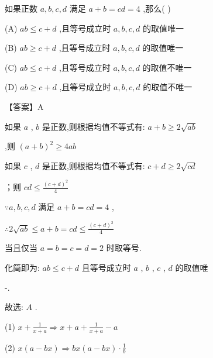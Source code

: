 \documentclass[11pt,a4paper]{article}
\begin{document}
\begin{problem} 
如果正数 \(\displaystyle a,b,c,d\) 满足 \(\displaystyle a + b = {cd} = 4\) ,那么(   )

(A) \(\displaystyle {ab} \leq  c + d\) ,且等号成立时 \(\displaystyle a,b,c,d\) 的取值唯一

(B) \(\displaystyle {ab} \geq  c + d\) ,且等号成立时 \(\displaystyle a,b,c,d\) 的取值唯一

(C) \(\displaystyle {ab} \leq  c + d\) ,且等号成立时 \(\displaystyle a,b,c,d\) 的取值不唯一

(D) \(\displaystyle {ab} \geq  c + d\) ,且等号成立时 \(\displaystyle a,b,c,d\) 的取值不唯一
\begin{jiexi}
【答案】A

如果 \(\displaystyle a\) , \(\displaystyle b\) 是正数,则根据均值不等式有: \(\displaystyle a + b \geq  2\sqrt{ab}\)

,则 \(\displaystyle {\left( a + b\right) }^{2} \geq  {4ab}\)

如果 \(\displaystyle c\) , \(\displaystyle d\) 是正数,则根据均值不等式有: \(\displaystyle c + d \geq  2\sqrt{cd}\)

；则 \(\displaystyle {cd} \leq  \frac{{\left( c + d\right) }^{2}}{4}\)

\(\displaystyle \because a,b,c,d\) 满足 \(\displaystyle a + b = {cd} = 4\) ,

\(\displaystyle \therefore 2\sqrt{ab} \leq  a + b = {cd} \leq  \frac{{\left( c + d\right) }^{2}}{4}\)

当且仅当 \(\displaystyle a = b = c = d = 2\) 时取等号.

化简即为: \(\displaystyle {ab} \leq  c + d\) 且等号成立时 \(\displaystyle a\) , \(\displaystyle b\) , \(\displaystyle c\) , \(\displaystyle d\) 的取值唯

-.

故选: \(\displaystyle A\) .

 (1) \(\displaystyle x + \frac{1}{x + a} \Rightarrow  x + a + \frac{1}{x + a} - a\)

 (2) \(\displaystyle x\left( {a - {bx}}\right)  \Rightarrow  {bx}\left( {a - {bx}}\right)  \cdot  \frac{1}{b}\)

\end{jiexi}
\end{problem}
\end{document}
